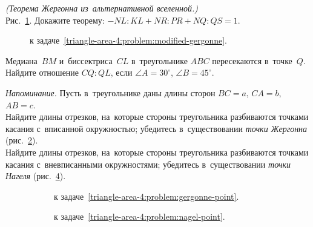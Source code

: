 \begin{problems}
\item
\label{triangle-area-4:problem:modified-gergonne}%
\emph{(Теорема Жергонна из~альтернативной вселенной.)}
\\
Рис.~\ref{triangle-area-4:problem:modified-gergonne:fig}.
Докажите теорему:\enspace
\(
    - NL : KL + NR : PR + NQ : QS = 1
\).

\begin{figure}[hb]
\begin{center}
    \caption{к задаче~\ref{triangle-area-4:problem:modified-gergonne}.}
    \label{triangle-area-4:problem:modified-gergonne:fig}
\end{center}
\end{figure}

\item
Медиана~$BM$ и~биссектриса~$CL$ в~треугольнике $ABC$ пересекаются в~точке~$Q$.
Найдите отношение $CQ : QL$, если $\angle A = 30^\circ$, $\angle B = 45^\circ$.

\item
\emph{Напоминание.}
Пусть в~треугольнике даны длины сторон $BC = a$, $CA = b$, $AB = c$.
\\
\subproblem
\label{triangle-area-4:problem:gergonne-point}%
Найдите длины отрезков, на~которые стороны треугольника разбиваются точками
касания с~вписанной окружностью;
убедитесь в~существовании \emph{точки Жергонна}
(рис.~\ref{triangle-area-4:problem:gergonne-point:fig}).
\\
\subproblem
\label{triangle-area-4:problem:nagel-point}%
Найдите длины отрезков, на~которые стороны треугольника разбиваются точками
касания с~вневписанными окружностями;
убедитесь в~существовании \emph{точки Нагеля}
(рис.~\ref{triangle-area-4:problem:nagel-point:fig}).

\begin{figure}[hb]
\leavevmode\null\hfill
    \begin{subfigure}{0.4\textwidth}
    \begin{center}
        \caption{к задаче~\ref{triangle-area-4:problem:gergonne-point}.}
        \label{triangle-area-4:problem:gergonne-point:fig}
    \end{center}
    \end{subfigure}
\hfill
    \begin{subfigure}{0.4\textwidth}
    \begin{center}
        \caption{к задаче~\ref{triangle-area-4:problem:nagel-point}.}
        \label{triangle-area-4:problem:nagel-point:fig}
    \end{center}
    \end{subfigure}
\hfill\null\par
    \caption{}
\end{figure}

\end{problems}

